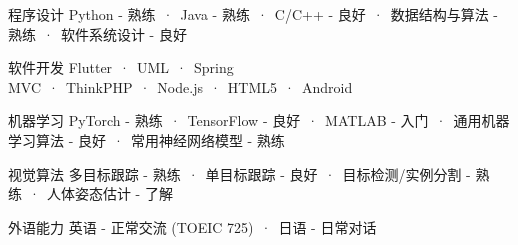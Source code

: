 

\begin{cvskills}
  \cvskill
    {程序设计} %
    {Python - 熟练\ ·\ Java - 熟练\ ·\ C/C++ - 良好\ ·\ 数据结构与算法 - 熟练\ ·\ 软件系统设计 - 良好} %
    
  \cvskill
    {软件开发} %
    {Flutter\ ·\ UML\ ·\ Spring MVC\ ·\ ThinkPHP\ ·\ Node.js\ ·\ HTML5\ ·\ Android} %

  \cvskill
    {机器学习} %
    {PyTorch - 熟练\ ·\ TensorFlow - 良好\ ·\ MATLAB - 入门\ ·\ 通用机器学习算法 - 良好\ ·\ 常用神经网络模型 - 熟练} %
    
  \cvskill
    {视觉算法} %
    {多目标跟踪 - 熟练\ ·\ 单目标跟踪 - 良好\ ·\ 目标检测/实例分割 - 熟练\ ·\ 人体姿态估计 - 了解} %
    
  \cvskill
    {外语能力} %
    {英语 - 正常交流 (TOEIC 725)\ ·\ 日语 - 日常对话} %
    

\end{cvskills}